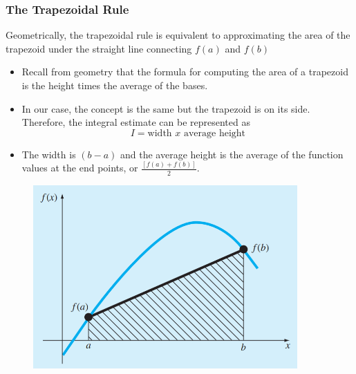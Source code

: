 \documentclass{if-beamer}
\begin{document}
\begin{frame}
	\frametitle{The Trapezoidal Rule}
	Geometrically, the trapezoidal rule is equivalent to approximating the area of the trapezoid under the straight line connecting $f(a)$ and $f(b)$\\\vspace{10pt}
	\begin{minipage}{0.5\textwidth}
		\begin{itemize}
			\item  Recall from geometry
			that the formula for computing the area of a trapezoid is the height times the average of the
			bases. 
			\item  In our case, the concept is the same but the trapezoid is on its side. Therefore, the
			integral estimate can be represented as
			$$I = \textrm{width } x \textrm{ average height}$$
			\item The width is $(b-a)$ and the average height is the average of the function values at
			the end points, or $\frac{[ f(a) + f(b)]}{2}$.
		\end{itemize}
	\end{minipage}
	\begin{minipage}{0.5\textwidth}
		\begin{figure}
			\centering
			\includegraphics[width=0.9\textwidth]{figures/traprule}
		\end{figure}
	\end{minipage}
\end{frame}
\end{document}

